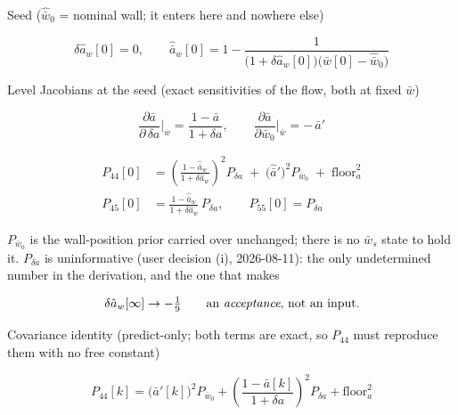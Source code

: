 \documentclass[11pt,a4paper,fontset=none]{ctexart}
\begin{document}
Seed ($\hat{\bar{w}}_0$ = nominal wall; it enters here and nowhere else)

\begin{equation*}
\delta\hat{a}_w[0] = 0,
\qquad
\hat{\bar{a}}_w[0] = 1 - \frac{1}
  {\bigl(1+\delta\hat{a}_w[0]\bigr)\bigl(\bar{w}[0]-\hat{\bar{w}}_0\bigr)}
\end{equation*}

Level Jacobians at the seed (exact sensitivities of the flow, both at fixed
$\bar{w}$)

\begin{equation*}
\frac{\partial\bar{a}}{\partial\,\delta a}\bigg|_{\bar{w}}
  = \frac{1-\bar{a}}{1+\delta a} ,
\qquad
\frac{\partial\bar{a}}{\partial\bar{w}_0}\bigg|_{\bar{w}} = -\,\bar{a}'
\end{equation*}

\begin{align*}
P_{44}[0] &= \left(\frac{1-\hat{\bar{a}}_w}{1+\delta\hat{a}_w}\right)^{2}
  P_{\delta a} \;+\; \bigl(\hat{\bar{a}}'\bigr)^{2} P_{\bar{w}_0}
  \;+\; \mathrm{floor}_a^{2} \\
P_{45}[0] &= \frac{1-\hat{\bar{a}}_w}{1+\delta\hat{a}_w}\,P_{\delta a},
\qquad P_{55}[0] = P_{\delta a}
\end{align*}

$P_{\bar{w}_0}$ is the wall-position prior carried over unchanged; there is no
$\bar{w}_s$ state to hold it.  $P_{\delta a}$ is uninformative (user decision
(i), 2026-08-11): the only undetermined number in the derivation, and the one
that makes

\begin{equation*}
\delta\hat{a}_w[\infty] \to -\tfrac{1}{9}
\qquad\text{an \emph{acceptance}, not an input.}
\end{equation*}

Covariance identity (predict-only; both terms are exact, so $P_{44}$ must
reproduce them with no free constant)

\begin{equation*}
P_{44}[k] = \bigl(\bar{a}'[k]\bigr)^{2} P_{\bar{w}_0}
  + \left(\frac{1-\bar{a}[k]}{1+\delta a}\right)^{2} P_{\delta a}
  + \mathrm{floor}_a^{2}
\end{equation*}
\end{document}
